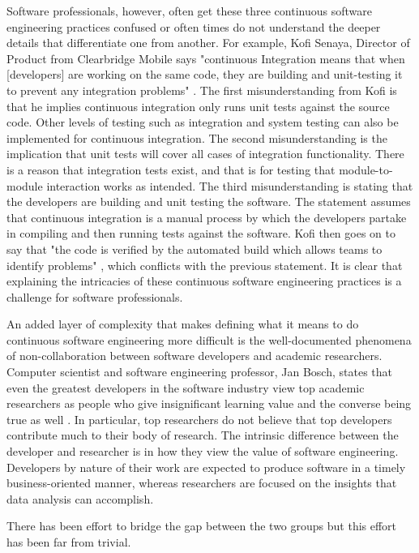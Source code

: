 \documentclass[12pt,a4paper]{article}
\begin{document}
Software professionals, however, often get these three continuous software engineering practices confused or often times do not understand the deeper details that differentiate one from another. For example, Kofi Senaya, Director of Product from Clearbridge Mobile says "continuous Integration means that when [developers] are working on the same code, they are building and unit-testing it to prevent any integration problems" \cite{stackify_2018}. The first misunderstanding from Kofi is that he implies continuous integration only runs unit tests against the source code. Other levels of testing such as integration and system testing can also be implemented for continuous integration. The second misunderstanding is the implication that unit tests will cover all cases of integration functionality. There is a reason that integration tests exist, and that is for testing that module-to-module interaction works as intended. The third misunderstanding is stating that the developers are building and unit testing the software. The statement assumes that continuous integration is a manual process by which the developers partake in compiling and then running tests against the software. Kofi then goes on to say that "the code is verified by the automated build which allows teams to identify problems" \cite{stackify_2018}, which conflicts with the previous statement. It is clear that explaining the intricacies of these continuous software engineering practices is a challenge for software professionals.

An added layer of complexity that makes defining what it means to do continuous software engineering more difficult is the well-documented phenomena of non-collaboration between software developers and academic researchers. Computer scientist and software engineering professor, Jan Bosch, states that even the greatest developers in the software industry view top academic researchers as people who give insignificant learning value and the converse being true as well \cite[p. ~29]{bosch_2014}. In particular, top researchers do not believe that top developers contribute much to their body of research. The intrinsic difference between the developer and researcher is in how they view the value of software engineering. Developers by nature of their work are expected to produce software in a timely business-oriented manner, whereas researchers are focused on the insights that data analysis can accomplish.

There has been effort to bridge the gap between the two groups but this effort has been far from trivial. 
\end{document}

